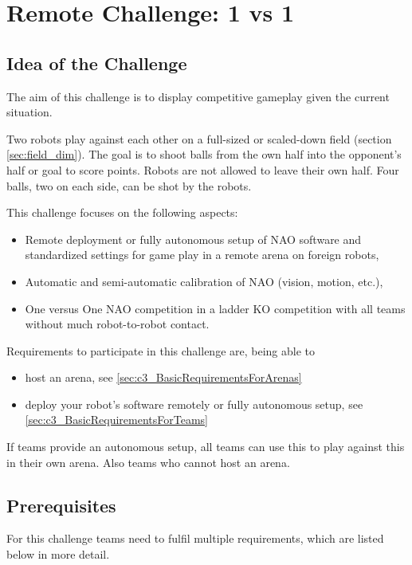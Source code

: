 \section{Remote Challenge: 1 vs 1}
\label{sec:OneVsOneChallenge}

\subsection{Idea of the Challenge}
The aim of this challenge is to display competitive gameplay given the current situation.

Two robots play against each other on a full-sized or scaled-down field (\cf section \ref{sec:field_dim}). The goal is to shoot balls from the own half into the opponent's half or goal to score points. Robots are not allowed to leave their own half. Four balls, two on each side, can be shot by the robots.

This challenge focuses on the following aspects:
\begin{itemize}
    \item Remote deployment or fully autonomous setup of NAO software and standardized settings for game play in a remote arena on foreign robots,
    \item Automatic and semi-automatic calibration of NAO (vision, motion, etc.), 
    \item One versus One NAO competition in a ladder KO competition with all teams without much robot-to-robot contact. 
\end{itemize}

Requirements to participate in this challenge are, being able to
\begin{itemize}
	\item host an arena, see \ref{sec:c3_BasicRequirementsForArenas}
	\item deploy your robot's software remotely or fully autonomous setup, see \ref{sec:c3_BasicRequirementsForTeams}
\end{itemize}

If teams provide an autonomous setup, all teams can use this to play against this in their own arena. Also teams who cannot host an arena.

\subsection{Prerequisites}
\label{sec:c3_Prerequisites}
For this challenge teams need to fulfil multiple requirements, which are listed below in more detail.

